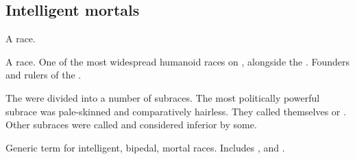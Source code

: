 \subsection{Intelligent mortals}
\begin{gloss}








\begin{comment}
\paragraph{\cregorr}
\end{comment}
\gitem[\cregorrs]{\cregorr}
A  race.









\begin{comment}
\paragraph{\human}
\end{comment}
\gitem{\human}
A  race. 
One of the most widespread humanoid races on \Miith{}, alongside the \scathae. 
Founders and rulers of the \VaimonCaliphate. 

The \humans were divided into a number of subraces. 
The most politically powerful subrace was pale-skinned and comparatively hairless. 
They called themselves  or . 
Other subraces were called \demihumans and considered inferior by some. 









\begin{comment}
\paragraph{humanoid}
\end{comment}
Generic term for intelligent, bipedal, mortal races. 
Includes ,  and . 








\end{gloss}
